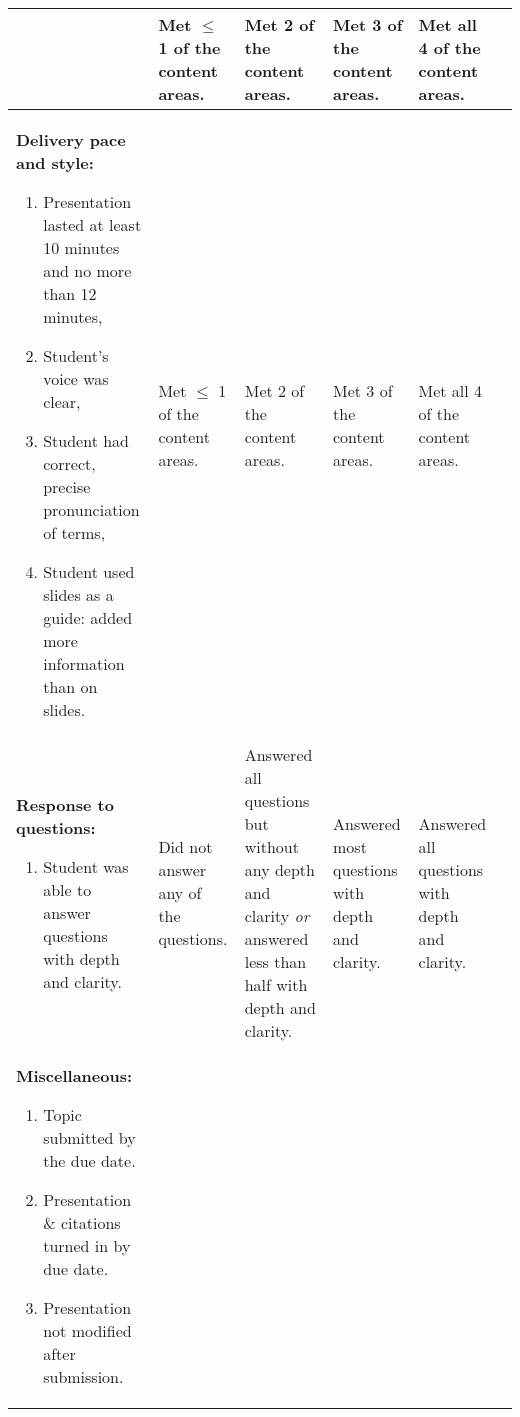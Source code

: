\documentclass[10pt]{article}
\begin{document}
\begin{landscape}
{\begin{longtable}[l]{@{}L{5cm}L{3.5cm}L{3.5cm}L{3.5cm}L{3.5cm}L{1.9cm}@{}}
\begin{enumerate}[itemsep=-0.25\baselineskip,align=left, leftmargin=*]
\end{enumerate}&%
Met $\leq$ 1 of the content areas. &%
Met 2 of the content areas. &%
Met 3 of the content areas. &%
Met all 4 of the content areas.&%
\\[-1em]
\midrule
\textbf{Delivery pace and style:}\par%
\vspace{-0.5\baselineskip}
\begin{enumerate}[itemsep=-0.25\baselineskip,align=left, leftmargin=*]
\item Presentation lasted at least 10 minutes and no more than 12 minutes, \par%
\item Student’s voice was clear, \par%
\item Student had correct, precise pronunciation of terms,\par%
\item Student used slides as a guide: added more information than on slides.
\end{enumerate}&%
Met $\leq$ 1 of the content areas. &%
Met 2 of the content areas. &%
Met 3 of the content areas. &%
Met all 4 of the content areas.&%
\\[-1em]
\midrule
\textbf{Response to questions:}\par%
\vspace{-0.5\baselineskip}
\begin{enumerate}[itemsep=-0.25\baselineskip,align=left, leftmargin=*]
\item Student was able to answer questions with depth and clarity.\end{enumerate}&%
Did not answer any of the questions. &%
Answered all questions but without any depth and clarity \emph{or} answered less than half with depth and clarity. &%
Answered most questions with depth and clarity. &%
Answered all questions with depth and clarity.&%
\\
\midrule
\textbf{Miscellaneous:}\par%
\vspace{-0.5\baselineskip}
\begin{enumerate}[itemsep=-0.25\baselineskip,align=left, leftmargin=*]
\item Topic submitted by the due date. \par%
\item Presentation \& citations turned in by due date. \par%
\item Presentation not modified after submission.\par%

\end{enumerate}
\end{longtable}}
\end{landscape}
\end{document}
